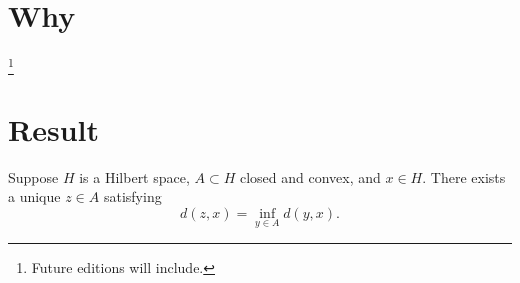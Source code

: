 
\section{Why}
  \ifhmode\unskip\fi\footnote{
Future editions will include.
  }

\section{Result}
\begin{proposition}
Suppose $H$ is a Hilbert space, $A \subset H$ closed and convex, and $x \in H$.
There exists a unique $z \in A$ satisfying
  \[
d(z, x) = \inf_{y \in A} d(y, x).
  \]
\end{proposition}

\blankpage
